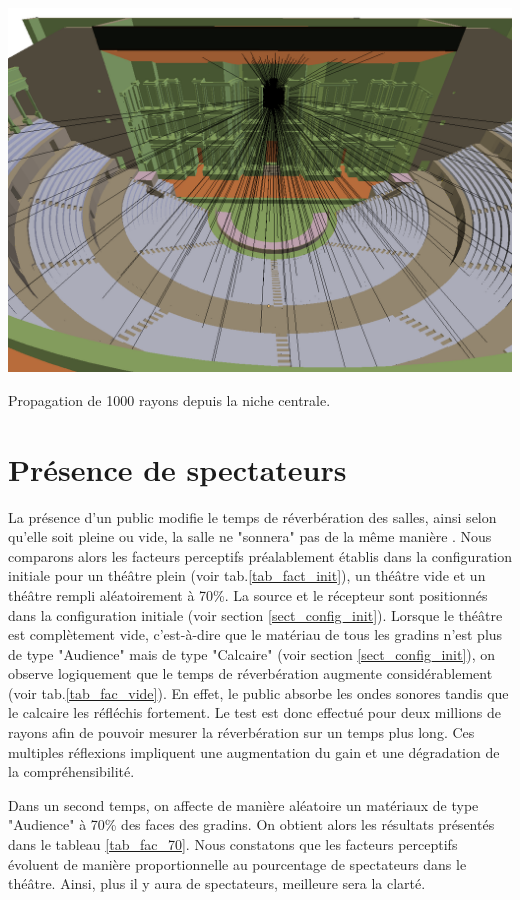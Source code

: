 \begin{figureth}
	\includegraphics[width=\linewidth]{images/voute}
	\caption{Propagation de 1000 rayons depuis la niche centrale.}
	\label{voute}
\end{figureth}


\section{Présence de spectateurs}
La présence d'un public modifie le temps de réverbération des salles, ainsi selon qu'elle soit pleine ou vide, la salle ne "sonnera" pas de la même manière \cite[p.212]{jouhaneau}. Nous comparons alors les facteurs perceptifs préalablement établis dans la configuration initiale pour un théâtre plein (voir tab.\ref{tab_fact_init}), un théâtre vide et un théâtre rempli aléatoirement à 70\%. La source et le récepteur sont positionnés dans la configuration initiale (voir section \ref{sect_config_init}). Lorsque le théâtre est complètement vide, c'est-à-dire que le matériau de tous les gradins n'est plus de type "Audience" mais de type "Calcaire" (voir section \ref{sect_config_init}), on observe logiquement que le temps de réverbération augmente considérablement (voir tab.\ref{tab_fac_vide}). En effet, le public absorbe les ondes sonores tandis que le calcaire les réfléchis fortement. Le test est donc effectué pour deux millions de rayons afin de pouvoir mesurer la réverbération sur un temps plus long. Ces multiples réflexions impliquent une augmentation du gain et une dégradation de la compréhensibilité.

Dans un second temps, on affecte de manière aléatoire un matériaux de type "Audience" à 70\% des faces des gradins. On obtient alors les résultats présentés dans le tableau \ref{tab_fac_70}. Nous constatons que les facteurs perceptifs évoluent de manière proportionnelle au pourcentage de spectateurs dans le théâtre. Ainsi, plus il y aura de spectateurs, meilleure sera la clarté. 


